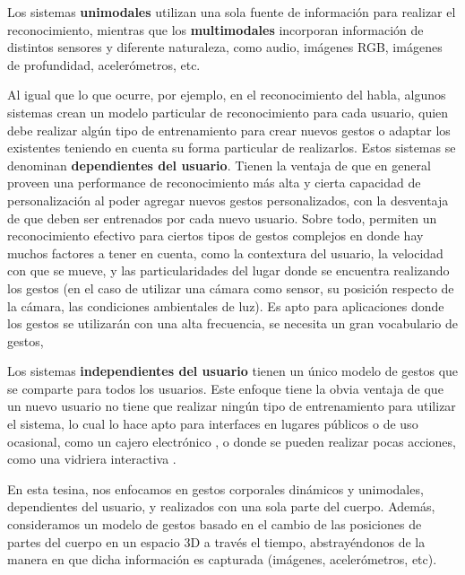 \begin{itemize}

Los sistemas \textbf{unimodales} utilizan una sola fuente de información para realizar el reconocimiento, mientras que los \textbf{multimodales} incorporan información de distintos sensores y diferente naturaleza, como audio, imágenes RGB, imágenes de profundidad, acelerómetros, etc.



Al igual que lo que ocurre, por ejemplo, en el reconocimiento del habla, algunos sistemas crean un modelo particular de reconocimiento para cada usuario, quien debe realizar algún tipo de entrenamiento para crear nuevos gestos o adaptar los existentes teniendo en cuenta su forma particular de realizarlos. Estos sistemas se denominan \textbf{dependientes del usuario}. Tienen la ventaja de que en general proveen una performance de reconocimiento más alta y cierta capacidad de personalización al poder agregar nuevos gestos personalizados, con la desventaja de que deben ser entrenados por cada nuevo usuario. Sobre todo, permiten un reconocimiento efectivo para ciertos tipos de gestos complejos en donde hay muchos factores a tener en cuenta, como la contextura del usuario, la velocidad con que se mueve, y las particularidades del lugar donde se encuentra realizando los gestos (en el caso de utilizar una cámara como sensor, su posición respecto de la cámara, las condiciones ambientales de luz). Es apto para aplicaciones donde los gestos se utilizarán con una alta frecuencia, se necesita un gran vocabulario de gestos,  

Los sistemas \textbf{independientes del usuario} tienen un único modelo de gestos que se comparte para todos los usuarios. Este enfoque tiene la obvia ventaja de que un nuevo usuario no tiene que realizar ningún tipo de entrenamiento para utilizar el sistema, lo cual lo hace apto para interfaces en lugares públicos o de uso ocasional, como un cajero electrónico \cite{rodriguez2008}, o donde se pueden realizar pocas acciones, como una vidriera interactiva \cite{mubin2009}.

\end{itemize}

En esta tesina, nos enfocamos en gestos corporales dinámicos y unimodales, dependientes del usuario, y realizados con una sola parte del cuerpo. Además, consideramos un modelo de gestos basado en el cambio de las posiciones de partes del cuerpo en un espacio 3D a través el tiempo, abstrayéndonos de la manera en que dicha información es capturada (imágenes, acelerómetros, etc). 

